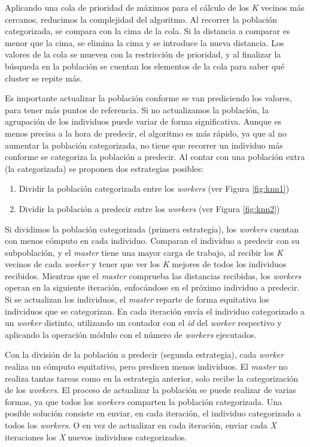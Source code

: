 		Aplicando una cola de prioridad de máximos para el cálculo de los \textit{K} vecinos más cercanos, reducimos la complejidad del algoritmo. Al recorrer la población categorizada, se compara con la cima de la cola. Si la distancia a comparar es menor que la cima, se elimina la cima y se introduce la nueva distancia. Los valores de la cola se mueven con la restricción de prioridad, y al finalizar la búsqueda en la población se cuentan los elementos de la cola para saber qué cluster se repite más.
		
		Es importante actualizar la población conforme se van prediciendo los valores, para tener más puntos de referencia. Si no actualizamos la población, la agrupación de los individuos puede variar de forma significativa. Aunque es menos precisa a la hora de predecir, el algoritmo es más rápido, ya que al no aumentar la población categorizada, no tiene que recorrer un individuo más conforme se categoriza la población a predecir. Al contar con una población extra (la categorizada) se proponen dos estrategias posibles:
		
		
		\begin{enumerate}
			\item Dividir la población categorizada entre los \textit{workers} (ver Figura \ref{fig:knn1})
			\item Dividir la población a predecir entre los \textit{workers} (ver Figura \ref{fig:knn2})
		\end{enumerate}
		
		Si dividimos la población categorizada (primera estrategia), los \textit{workers} cuentan con menos cómputo en cada individuo. Comparan el individuo a predecir con su subpoblación, y el \textit{master} tiene una mayor carga de trabajo, al recibir los \textit{K} vecinos de cada \textit{worker} y tener que ver los \textit{K} mejores de todos los individuos recibidos.  Mientras que el \textit{master} comprueba las distancias recibidas, los \textit{workers} operan en la siguiente iteración, enfocándose en el próximo individuo a predecir. Si se actualizan los individuos, el \textit{master} reparte de forma equitativa los individuos que se categorizan. En cada iteración envía el individuo categorizado a un \textit{worker} distinto, utilizando un contador con el \textit{id} del \textit{worker} respectivo y aplicando la operación módulo con el número de \textit{workers} ejecutados.
		
		Con la división de la población a predecir (segunda estrategia), cada \textit{worker} realiza un cómputo equitativo, pero predicen menos individuos. El \textit{master} no realiza tantas tareas como en la estrategia anterior, solo recibe la categorización de los \textit{workers}. El proceso de actualizar la población se puede realizar de varias formas, ya que todos los \textit{workers} comparten la población categorizada. Una posible solución consiste en enviar, en cada iteración, el individuo categorizado a todos los \textit{workers}. O en vez de actualizar en cada iteración, enviar cada \textit{X} iteraciones los \textit{X} nuevos individuos categorizados.
		
